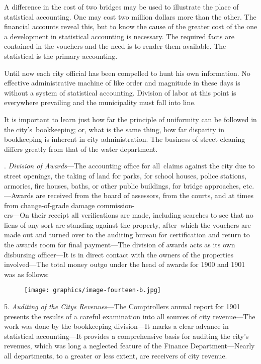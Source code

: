 \documentclass[twoside,symmetric,nobib,justified]{tufte-book}
\begin{document}
A difference in the cost of two bridges may be used to illustrate the
place of statistical accounting. One may cost two million dollars more
than the other. The financial accounts reveal this, but to know the
cause of the greater cost of the one a development in statistical
accounting is necessary. The required facts are contained in the
vouchers and the need is to render them available. The statistical is
the primary accounting.~~

Until now each city official has been compelled to hunt his own
information. No effective administrative machine of like order and
magnitude in these days is without a system of statistical accounting.
Division of labor at this point is everywhere prevailing and the
municipality must fall into line.~

It is important to learn just how far the principle of uniformity can be
followed in the city's~bookkeeping; or, what is the same thing, how far
disparity in bookkeeping is inherent in city administration. The
business of street cleaning differs greatly from that of the water
department.~

\vspace{.15in}

.\emph{ Division of Awards}---The accounting office for all~claims
against the city due to street openings, the taking of land for parks,
for school houses, police stations, armories, fire houses, baths, or
other public buildings, for bridge approaches, etc.---Awards are
received from the board of assessors, from the courts, and at times from
change-of-grade damage commission-\\\noindent ers---On their receipt all
verifications are made, including searches to see that no liens of any
sort are standing against the property, after~which the vouchers are
made out and turned over to the auditing bureau for certification and
return to the awards room for final payment---The division of awards
acts as its own disbursing officer---It is in direct contact with the
owners of the properties involved---The total money outgo under the head
of awards for 1900 and 1901 was as follows:~

\begin{figure}
    \centering
    \texttt{[image: graphics/image-fourteen-b.jpg]}
    \label{fig:fig14a}
\end{figure}

5.\emph{ Auditing of the City\textquotesingle s Revenues}---The
Comptroller\textquotesingle s annual report for 1901 presents the
results of a careful examination into all sources of city revenue---The
work was done by the bookkeeping division---It marks a clear advance in
statistical accounting---It provides a comprehensive basis for auditing
the city's revenues, which was long a neglected feature of the Finance
Department---Nearly all departments, to a greater or less extent, are
receivers of city revenue.~
\end{document}
